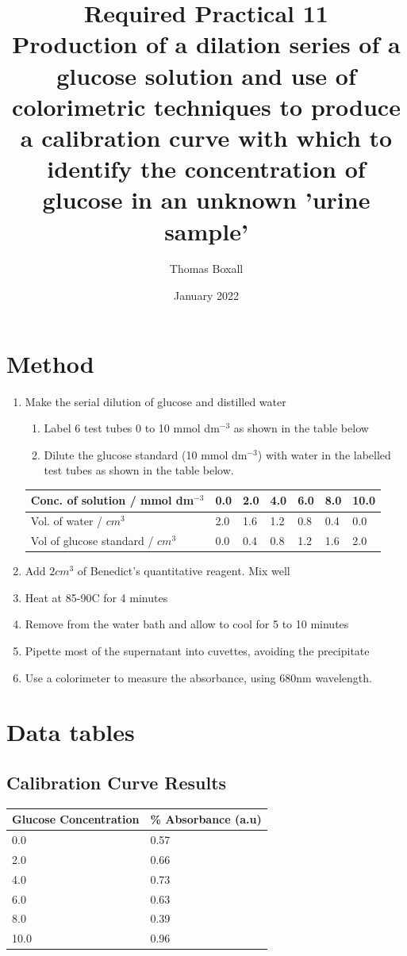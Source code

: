 \documentclass{thomasClass}
\title{\textbf{Required Practical 11}
\\Production of a dilation series of a glucose solution and use of colorimetric techniques to produce a calibration curve with which to identify the concentration of glucose in an unknown 'urine sample'
}
\author{Thomas Boxall}
\date{January 2022}
\begin{document}
\maketitle

\section{Method}
\begin{enumerate}
    \item Make the serial dilution of glucose and distilled water
    \begin{enumerate}
        \item Label 6 test tubes 0 to 10 mmol dm$^{-3}$ as shown in the table below
        \item Dilute the glucose standard (10 mmol dm$^{-3}$) with water in the labelled test tubes as shown in the table below.
    \end{enumerate}
    \begin{table}[H]
    \centering
    \begin{tabularx}{0.625\textwidth}{l|llllll}
    Conc. of solution / mmol dm$^{-3}$ & 0.0 & 2.0 & 4.0 & 6.0 & 8.0 & 10.0 \\
    \hline
    Vol. of water / $cm^3$ & 2.0 & 1.6 & 1.2 & 0.8 & 0.4 & 0.0 \\
    Vol of glucose standard / $cm^3$  & 0.0 & 0.4 & 0.8 & 1.2 & 1.6 & 2.0
    \end{tabularx}
    \end{table}
    \item Add $2cm^3$ of Benedict's quantitative reagent. Mix well
    \item Heat at 85-90\textdegree C for 4 minutes
    \item Remove from the water bath and allow to cool for 5 to 10 minutes
    \item Pipette most of the supernatant into cuvettes, avoiding the precipitate
    \item Use a colorimeter to measure the absorbance, using 680nm wavelength.
\end{enumerate}

\section{Data tables}
\subsection{Calibration Curve Results}
\begin{table}[H]
\begin{tabularx}{0.5\textwidth}{l|l}
Glucose Concentration & \% Absorbance (a.u) \\
\hline
0.0 & 0.57 \\
2.0 & 0.66 \\
4.0 & 0.73 \\
6.0 & 0.63 \\
8.0 & 0.39 \\
10.0 & 0.96
\end{tabularx}
\end{table}
\end{document}
